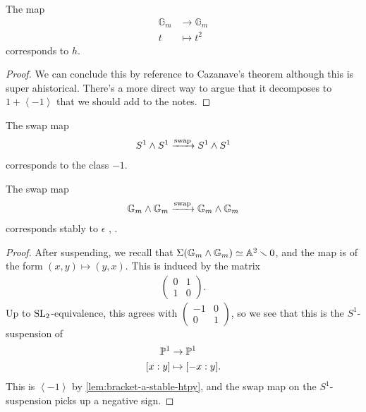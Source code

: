 \documentclass[11pt,openany]{book}
\let\smashprod\wedge
\begin{document}
\begin{proposition} The map
\begin{align*}
    \mathbb{G}_m &\to \mathbb{G}_m \\
    t &\mapsto t^2
\end{align*}
corresponds to $h$.
\end{proposition}
\begin{proof} We can conclude this by reference to Cazanave's theorem although this is super ahistorical. There's a more direct way to argue that it decomposes to $1 + \left\langle -1 \right\rangle$ that we should add to the notes.
\end{proof}






\begin{proposition} The swap map
\begin{align*}
    S^1 \smashprod S^1 \xto{\text{swap}} S^1 \smashprod S^1
\end{align*}
corresponds to the class $-1$.
\end{proposition}



\begin{proposition} The swap map
\begin{align*}
    \mathbb{G}_m \smashprod \mathbb{G}_m \xto{\text{swap}} \mathbb{G}_m \smashprod \mathbb{G}_m
\end{align*}
corresponds stably to $\epsilon$ \cite[3.43]{Morel}, \cite[6.1.1(2)]{Trieste}.
\end{proposition}
\begin{proof} After suspending, we recall that $\Sigma (\mathbb{G}_m \smashprod \mathbb{G}_m) \simeq \A^2\minus 0$, and the map is of the form $(x,y) \mapsto (y,x)$. This is induced by the matrix
\begin{align*}
    \begin{pmatrix} 0 & 1 \\ 1 & 0 \end{pmatrix}.
\end{align*}
Up to $\SL_2$-equivalence, this agrees with $\begin{pmatrix} -1 & 0 \\ 0 & 1 \end{pmatrix}$, so we see that this is the $S^1$-suspension of
\begin{align*}
    \P^1 &\to \P^1 \\
    [x:y] &\mapsto [-x:y].
\end{align*}
This is $\left\langle -1 \right\rangle$ by \autoref{lem:bracket-a-stable-htpy}, and the swap map on the $S^1$-suspension picks up a negative sign.
\end{proof}
\end{document}
